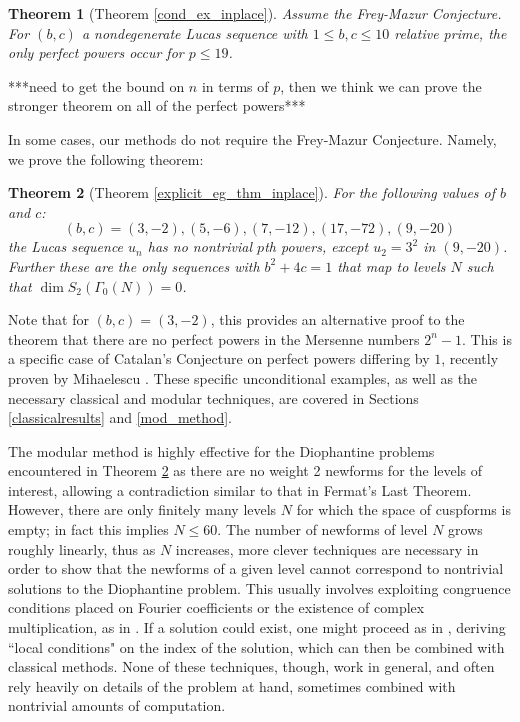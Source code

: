 \documentclass[12pt]{amsart}
\newtheorem{ithm}{Theorem}
\theoremstyle{definition}
\begin{document}
\begin{ithm}[Theorem \ref{cond_ex_inplace}]\label{cond_ex}
Assume the Frey-Mazur Conjecture.  For $(b,c)$ a nondegenerate Lucas sequence with $1 \leq b,c \leq 10$ relative prime, the only perfect powers occur for $p \leq 19$.
\end{ithm}

***need to get the bound on $n$ in terms of $p$, then we think we can prove the stronger theorem on all of the perfect powers***


In some cases, our methods do not require the Frey-Mazur Conjecture.  Namely, we prove the following theorem:

\begin{ithm}[Theorem \ref{explicit_eg_thm_inplace}]\label{explicit_eg_thm}
For the following values of $b$ and $c$:
\begin{equation}\label{examples} (b,c) = (3,-2), (5,-6), (7,-12), (17,-72), (9,-20) \end{equation}
the Lucas sequence $u_n$ has no nontrivial $p$th powers, except $u_2 = 3^2$ in $(9,-20)$.  Further these are the only sequences with $b^2+4c = 1$ that map to levels $N$ such that $\dim S_2(\Gamma_0(N)) = 0$.
\end{ithm}

Note that for $(b,c) = (3,-2)$, this provides an alternative proof to the theorem that there are no perfect powers in the Mersenne numbers $2^n - 1$.  This is a specific case of Catalan's Conjecture on perfect powers differing by $1$, recently proven by Mihaelescu \cite{mih04}.  These specific unconditional examples, as well as the necessary classical and modular techniques, are covered in Sections \ref{classicalresults} and \ref{mod_method}.

The modular method is highly effective for the Diophantine problems encountered in Theorem \ref{explicit_eg_thm} as there are no weight 2 newforms for the levels of interest, allowing a contradiction similar to that in Fermat's Last Theorem.  However, there are only finitely many levels $N$ for which the space of cuspforms is empty; in fact this implies $N \leq 60$.  The number of newforms of level $N$ grows roughly linearly, thus as $N$ increases, more clever techniques are necessary in order to show that the newforms of a given level cannot correspond to nontrivial solutions to the Diophantine problem.  This usually involves exploiting congruence conditions placed on Fourier coefficients or the existence of complex multiplication, as in \cite{bennett04}.  If a solution could exist, one might proceed as in \cite{siksek06}, deriving ``local conditions" on the index of the solution, which can then be combined with classical methods.  None of these techniques, though, work in general, and often rely heavily on details of the problem at hand, sometimes combined with nontrivial amounts of computation.
\end{document}
